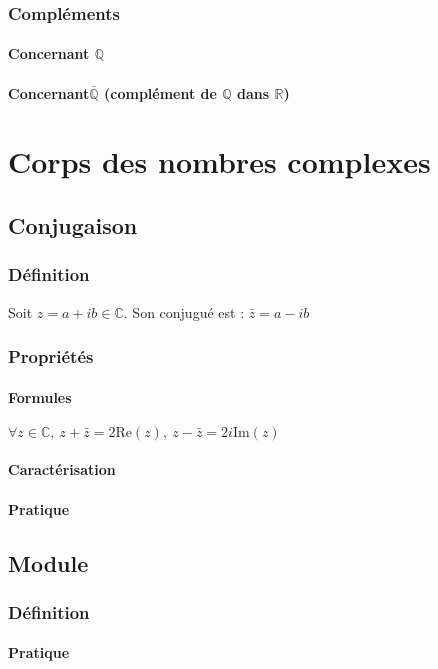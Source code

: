 \documentclass[12pt,a4paper,french]{book}
\begin{document}
		\subsection{Compléments}
			\subsubsection{Concernant $\mathbb{Q}$}
			\subsubsection{Concernant$\bar{\mathbb{Q}}$ (complément de $\mathbb{Q}$ dans $\mathbb{R}$)}
			
\chapter{Corps des nombres complexes}
	\section{Conjugaison}
		\subsection{Définition}
		Soit $z = a+ib \in \mathbb{C}$. Son conjugué est : $\bar{z} = a - ib$
		\subsection{Propriétés}
			\subsubsection{Formules}
			$\forall z \in \mathbb{C}, \ z+ \bar{z} = 2\mbox{Re}(z), \ z - \bar{z} = 2i\mbox{Im}(z)$
			\subsubsection{Caractérisation}
			\subsubsection{Pratique}
	\section{Module}
		\subsection{Définition}
			\subsubsection{Pratique}
\end{document}
